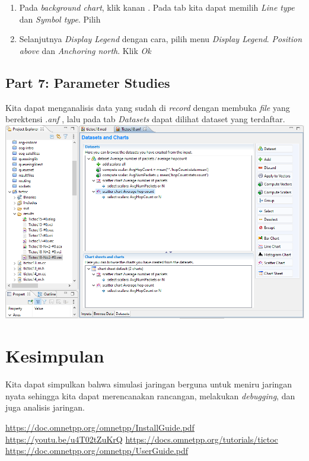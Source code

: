 \documentclass[conference]{IEEEtran}
\begin{document}
\begin{enumerate}
  \item Pada \textit{background chart}, klik kanan . Pada tab  kita dapat memilih \textit{Line type} dan \textit{Symbol type}. Pilih 
  \item Selanjutnya \textit{Display Legend} dengan cara, pilih menu  \textit{Display Legend}. \textit{Position above} dan \textit{Anchoring north}. Klik \textit{Ok}
\end{enumerate}

\subsection{Part 7: Parameter Studies}
Kita dapat menganalisis data yang sudah di \textit{record} dengan membuka \textit{file} yang berektensi \textit{.anf} , lalu pada tab \textit{Datasets} dapat dilihat dataset yang terdaftar.
\includegraphics[scale=0.18]{images/tictoc18-analysis-file.png}

\section{Kesimpulan}
Kita dapat simpulkan bahwa simulasi jaringan berguna untuk meniru jaringan nyata sehingga kita dapat merencanakan rancangan, melakukan \textit{debugging}, dan juga analisis jaringan.


\begin{thebibliography}{1}
  \url{https://doc.omnetpp.org/omnetpp/InstallGuide.pdf}
  \url{https://youtu.be/u4T02tZuKrQ}
  \url{https://docs.omnetpp.org/tutorials/tictoc}
  \url{https://doc.omnetpp.org/omnetpp/UserGuide.pdf}
\end{thebibliography}
\end{document}
